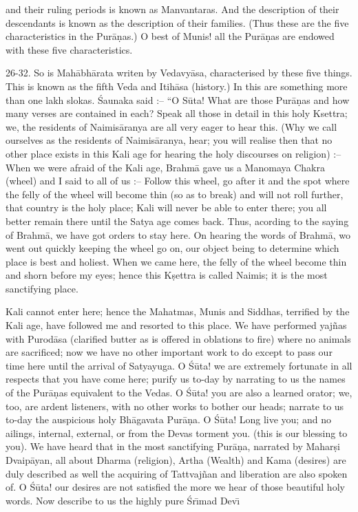 and their ruling periods is known as Manvantaras. And the description of their descendants is known as the description of their families. (Thus these are the five characteristics in the Pur\=a\d{n}as.) O best of Munis! all the Pur\=a\d{n}as are endowed with these five characteristics.

26-32. So is Mah\=abh\=arata writen by Vedavy\=asa, characterised by these five things. This is known as the fifth Veda and Itih\=asa (history.) In this are something more than one lakh slokas. \'Saunaka said :-- ``O S\=uta! What are those Pur\=a\d{n}as and how many verses are contained in each? Speak all those in detail in this holy Ksettra; we, the residents of Naimis\=aranya are all very eager to hear this. (Why we call ourselves as the residents of Naimis\=aranya, hear; you will realise then that no other place exists in this Kali age for hearing the holy discourses on religion) :-- When we were afraid of the Kali age, Brahm\=a gave us a Manomaya Chakra (wheel) and I said to all of us :-- Follow this wheel, go after it and the spot where the felly of the wheel will become thin (so as to break) and will not roll further, that country is the holy place; Kali will never be able to enter there; you all better remain there until the Satya age comes back. Thus, acording to the saying of Brahm\=a, we have got orders to stay here. On hearing the words of Brahm\=a, wo went out quickly keeping the wheel go on, our object being to determine which place is best and holiest. When we came here, the felly of the wheel become thin and shorn before my eyes; hence this K\d{s}ettra is called Naimis; it is the most sanctifying place.

Kali cannot enter here; hence the Mahatmas, Munis and Siddhas, terrified by the Kali age, have followed me and resorted to this place. We have performed yaj\~nas with Purod\=asa (clarified butter as is offered in oblations to fire) where no animals are sacrificed; now we have no other important work to do except to pass our time here until the arrival of Satyayuga. O \'S\=uta! we are extremely fortunate in all respects that you have come here; purify us to-day by narrating to us the names of the Pur\=a\d{n}as equivalent to the Vedas. O \'S\=uta! you are also a learned orator; we, too, are ardent listeners, with no other works to bother our heads; narrate to us to-day the auspicious holy Bh\=agavata Pur\=a\d{n}a. O \'S\=uta! Long live you; and no ailings, internal, external, or from the Devas torment you. (this is our blessing to you). We have heard that in the most sanctifying Pur\=a\d{n}a, narrated by Mahar\d{s}i Dvaip\=ayan, all about Dharma (religion), Artha (Wealth) and Kama (desires) are duly described as well the acquiring of Tattvaj\~nan and liberation are also spoken of. O \'S\=uta! our desires are not satisfied the more we hear of those beautiful holy words. Now describe to us the highly pure \'Sr\={\i}mad Dev\={\i}


